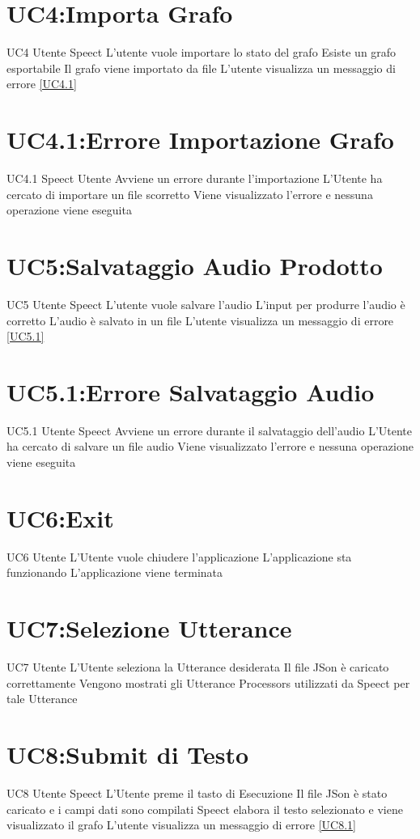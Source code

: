 \documentclass[../AnalisideiRequisiti.tex]{subfiles}
\begin{document}
\section{UC4:Importa Grafo}
\UserCase
{UC4}
{Utente}
{Speect}
{L'utente vuole importare lo stato del grafo}
{Esiste un grafo esportabile}
{Il grafo viene importato da file}
{L'utente visualizza un messaggio di errore \ref{UC4.1}}
{}
\section{UC4.1:Errore Importazione Grafo}
\UserCase
{UC4.1}
{Speect}
{Utente}
{Avviene un errore durante l'importazione}
{L'Utente ha cercato di importare un file scorretto}
{Viene visualizzato l'errore e nessuna operazione viene eseguita}
{}
{}
\section{UC5:Salvataggio Audio Prodotto}
\UserCase
{UC5}
{Utente}
{Speect}
{L'utente vuole salvare l'audio}
{L'input per produrre l'audio è corretto}
{L'audio è salvato in un file}
{L'utente visualizza un messaggio di errore \ref{UC5.1}}
{}
\section{UC5.1:Errore Salvataggio Audio}
\UserCase
{UC5.1}
{Utente}
{Speect}
{Avviene un errore durante il salvataggio dell'audio}
{L'Utente ha cercato di salvare un file audio}
{Viene visualizzato l'errore e nessuna operazione viene eseguita}
{}
{}
\section{UC6:Exit}
\UserCase
{UC6}
{Utente}
{}
{L'Utente vuole chiudere l'applicazione }
{L'applicazione sta funzionando}
{L'applicazione viene terminata}
{}
{
}

\section{UC7:Selezione Utterance}
\UserCase
{UC7}
{Utente}
{}
{L'Utente seleziona la Utterance desiderata }
{Il file JSon è caricato correttamente}
{Vengono mostrati gli Utterance Processors utilizzati da Speect per tale Utterance}
{}
{}

\section{UC8:Submit di Testo}
\UserCase
{UC8}
{Utente}
{Speect}
{L'Utente preme il tasto di Esecuzione }
{Il file JSon è stato caricato e i campi dati sono compilati}
{Speect elabora il testo selezionato e viene visualizzato il grafo}
{L'utente visualizza un messaggio di errore \ref{UC8.1}}
{}
\end{document}
